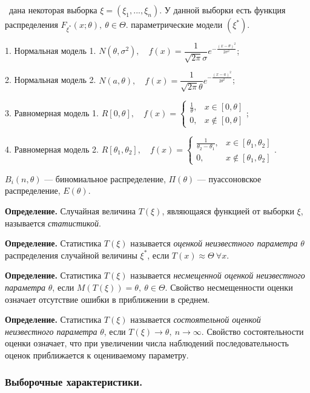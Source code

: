 \documentclass[9pt]{article}
\begin{document}
\ 
 дана некоторая выборка \(\xi=(\xi_1,...,\xi_n)\). У данной выборки есть функция распределения \(F_{\xi^*}(x;\theta),\ \theta\in\Theta\).
\parОсновные параметрические модели \((\xi^*)\).
\par1. Нормальная модель 1. \(N(\theta,\sigma^2),\quad f(x)=\dfrac{1}{\sqrt{2\pi}\sigma}e^{-\frac{(x-\theta)^2}{2\sigma^2}}\);
\par2. Нормальная модель 2. \(N(a,\theta),\quad f(x)=\dfrac{1}{\sqrt{2\pi}\theta}e^{-\frac{(x-a)^2}{2\theta^2}}\);
\par3. Равномерная модель 1. \(R[0,\theta],\quad f(x)=\left\{
\begin{array}{ll}
    \frac{1}{\theta}, & x\in[0,\theta] \\
    0, & x\notin[0,\theta]
\end{array}\right.\);
\par4. Равномерная модель 2. \(R[\theta_1,\theta_2],\quad f(x)=\left\{
\begin{array}{ll}
    \frac{1}{\theta_2-\theta_1}, & x\in[\theta_1,\theta_2] \\
    0, & x\notin[\theta_1,\theta_2]
\end{array}\right.\).
\par\(B_i(n,\theta)\) --- биномиальное распределение, \(\Pi(\theta)\) --- пуассоновское распределение, \(E(\theta)\).
\par\textbf{Определение.} Случайная величина \(T(\xi)\), являющаяся функцией от выборки \(\xi\), называется \textit{статистикой}.
\par\textbf{Определение.} Статистика \(T(\xi)\) называется \textit{оценкой неизвестного параметра} \(\theta\) распределения случайной величины \(\xi^*\), если \(T(x)\approx\Theta\ \forall x\).
\par\textbf{Определение.} Статистика \(T(\xi)\) называется \textit{несмещенной оценкой неизвестного параметра} \(\theta\), если \(M(T(\xi))=\theta,\ \theta\in\Theta\). Свойство несмещенности оценки означает отсутствие ошибки в приближении в среднем.
\par\textbf{Определение.} Статистика \(T(\xi)\) называется \textit{состоятельной оценкой неизвестного параметра} \(\theta\), если \(T(\xi)\to\theta,\ n\to\infty\). Свойство состоятельности оценки означает, что при увеличении числа наблюдений последовательность оценок приближается к оцениваемому параметру.

\subsubsection{Выборочные характеристики.}
\end{document}
